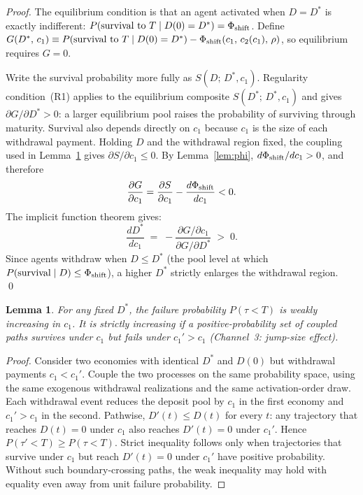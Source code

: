 \documentclass[12pt]{article}\usepackage[]{graphicx}\usepackage[]{xcolor}
\newtheorem{lemma}{Lemma}
\begin{document}
\begin{proof}
The equilibrium condition is that an agent activated when $D = D^*$ is exactly indifferent: $P(\text{survival to }T\mid D(0)=D^*)=\Phi_{\rm shift}$.
Define $G(D^*,\, c_1) \equiv P(\text{survival to }T \mid D(0) = D^*) - \Phi_{\rm shift}(c_1,\, c_2(c_1),\, \rho)$, so equilibrium requires $G = 0$.

Write the survival probability more fully as $S(D;\,D^*,c_1)$.
Regularity condition~(R1) applies to the equilibrium composite $S(D^*;\,D^*,c_1)$ and gives $\partial G/\partial D^*>0$: a larger equilibrium pool raises the probability of surviving through maturity.
Survival also depends directly on $c_1$ because $c_1$ is the size of each withdrawal payment.
Holding $D$ and the withdrawal region fixed, the coupling used in Lemma~\ref{lem:jump} gives $\partial S/\partial c_1\leq0$.
By Lemma~\ref{lem:phi}, $d\Phi_{\rm shift}/dc_1>0$, and therefore \[ \frac{\partial G}{\partial c_1} = \frac{\partial S}{\partial c_1} - \frac{d\Phi_{\rm shift}}{dc_1} <0. \] The implicit function theorem gives: \[ \frac{dD^*}{dc_1} \;=\; -\frac{\partial G/\partial c_1}{\partial G/\partial D^*} \;>\; 0. \] Since agents withdraw when $D \leq D^*$ (the pool level at which $P(\text{survival}\mid D) \leq \Phi_{\rm shift}$), a higher $D^*$ strictly enlarges the withdrawal region.
\qed
\end{proof}

\begin{lemma}
\label{lem:jump}
For any fixed $D^*$, the failure probability $P(\tau < T)$ is weakly increasing in $c_1$.
It is strictly increasing if a positive-probability set of coupled paths survives under $c_1$ but fails under $c_1'>c_1$ (Channel~3: jump-size effect).
\end{lemma}

\begin{proof}
Consider two economies with identical $D^*$ and $D(0)$ but withdrawal payments $c_1 < c_1'$.
Couple the two processes on the same probability space, using the same exogenous withdrawal realizations and the same activation-order draw.
Each withdrawal event reduces the deposit pool by $c_1$ in the first economy and $c_1' > c_1$ in the second.
Pathwise, $D'(t) \leq D(t)$ for every $t$: any trajectory that reaches $D(t) = 0$ under $c_1$ also reaches $D'(t) = 0$ under $c_1'$.
Hence $P(\tau' < T) \geq P(\tau < T)$.
Strict inequality follows only when trajectories that survive under $c_1$ but reach $D'(t)=0$ under $c_1'$ have positive probability.
Without such boundary-crossing paths, the weak inequality may hold with equality even away from unit failure probability.
\end{proof}
\end{document}
